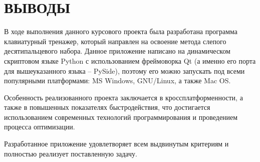 \section*{\centering ВЫВОДЫ}

\vspace{0.6cm}

В ходе выполнения данного курсового проекта была разработана программа
клавиатурный тренажер, который направлен на освоение метода слепого десятипальцевого набора.
Данное приложение написано на динамическом скриптовом языке Python с использованием фреймоворка Qt 
(а именно его порта для вышеуказанного языка -- PySide), поэтому его можно запускать под всеми 
популярными платформами: MS Windows, GNU/Linux, а также Mac OS.

Особенность реализованного проекта заключается в кроссплатформенности, а также в повышенных 
показателях быстродействия, что достигается использованием современных технологий программирования
и проведением процесса оптимизации.

Разработанное приложение удовлетворяет всем выдвинутым критериям и полностью
реализует поставленную задачу.
